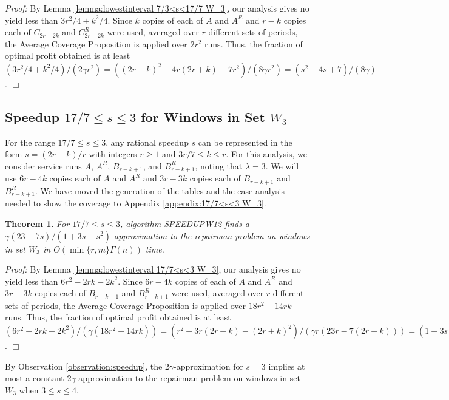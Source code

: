 \documentclass[11pt]{article}
\newtheorem{theorem}{Theorem}[section]
\newcommand\QED{\ifhmode\allowbreak\else\nobreak\fi
\quad\nobreak$\Box$\medbreak}
\newcommand{\proofstart}{\par\noindent \emph{Proof:} }
\newcommand{\proofend}{\QED\par}
\newenvironment{proof}{\proofstart}{\proofend}
\begin{document}
\begin{proof}
By Lemma \ref{lemma:lowestinterval 7/3<s<17/7 W_3}, our analysis gives no yield less than $3r^2/4 + k^2/4$.  Since $k$ copies of each of $A$ and $A^R$ and $r - k$ copies each of $C_{2r - 2k}$ and $C_{2r - 2k}^R$ were used, averaged over $r$ different sets of periods, the Average Coverage Proposition is applied over $2r^2$ runs.  Thus, the fraction of optimal profit obtained is at least ${ (3r^2/4 + k^2/4)/(2\gamma r^2) } = {((2r + k)^2 - 4r(2r + k) + 7r^2)/(8\gamma r^2)} = ( s^2 - 4s + 7)/(8\gamma)$.
\end{proof}

\subsection{Speedup $17/7 \leq s \leq 3$ for Windows in Set $W_3$}

For the range $17/7 \leq s \leq 3$, any rational speedup $s$ can be represented in the form $s = (2r + k)/r$ with integers $r \geq 1$ and $3r/7 \leq k \leq r$.  For this analysis, we consider service runs $A$, $A^R$, $B_{r - k + 1}$, and $B_{r - k + 1}^R$, noting that $\lambda = 3$. We will use $6r - 4k$ copies each of $A$ and $A^R$ and $3r - 3k$ copies each of $B_{r - k + 1}$ and $B_{r - k + 1}^R$.  We have moved the generation of the tables and the case analysis needed to show the coverage to Appendix \ref{appendix:17/7<s<3 W_3}.

\begin{theorem}
For $17/7 \leq s \leq 3$, algorithm SPEEDUPW12 finds a $\gamma(23 - 7s)/(1 + 3s - s^2)$-approximation to the repairman problem on windows in set $W_3$ in $O(\min\{r, m\}\Gamma(n))$ time.
\end{theorem}

\begin{proof}
By Lemma \ref{lemma:lowestinterval 17/7<s<3 W_3}, our analysis gives no yield less than $6r^2 - 2rk - 2k^2$.  Since $6r - 4k$ copies of each of $A$ and $A^R$ and $3r - 3k$ copies each of $B_{r - k + 1}$ and $B_{r - k + 1}^R$ were used, averaged over $r$ different sets of periods, the Average Coverage Proposition is applied over $18r^2 - 14rk$ runs.  Thus, the fraction of optimal profit obtained is at least ${ (6r^2 - 2rk - 2k^2)/(\gamma (18r^2 - 14rk)) } = {(r^2 + 3r(2r + k) - (2r + k)^2)/(\gamma r(23r - 7(2r + k)))} = (1 + 3 s - s^2)/(\gamma(23 - 7s))$.
\end{proof}

By Observation \ref{observation:speedup}, the $2\gamma$-approximation for $s = 3$ implies at most a constant $2\gamma$-approximation to the repairman problem on windows in set $W_3$ when $3 \leq s \leq 4$.
\end{document}
